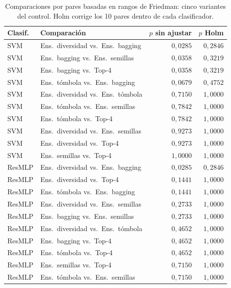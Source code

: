 \documentclass[11pt,a4paper]{article}
\begin{document}
\begin{table}[H]
\centering\fontsize{8}{10}\selectfont\setlength{\tabcolsep}{3.0pt}
\caption{Comparaciones por pares basadas en rangos de Friedman: cinco variantes del control. Holm corrige los 10 pares dentro de cada clasificador.}
\label{tab:sel-control-holm}
\begin{tabular}{@{}llrr@{}}
\toprule
Clasif. & Comparación & $p$ sin ajustar & $p$ Holm \\
\midrule
SVM & Ens.\ diversidad vs.\ Ens.\ bagging & $0{,}0285$ & $0{,}2846$ \\
SVM & Ens.\ bagging vs.\ Ens.\ semillas & $0{,}0358$ & $0{,}3219$ \\
SVM & Ens.\ bagging vs.\ Top-4 & $0{,}0358$ & $0{,}3219$ \\
SVM & Ens.\ tómbola vs.\ Ens.\ bagging & $0{,}0679$ & $0{,}4752$ \\
SVM & Ens.\ diversidad vs.\ Ens.\ tómbola & $0{,}7150$ & $1{,}0000$ \\
SVM & Ens.\ tómbola vs.\ Ens.\ semillas & $0{,}7842$ & $1{,}0000$ \\
SVM & Ens.\ tómbola vs.\ Top-4 & $0{,}7842$ & $1{,}0000$ \\
SVM & Ens.\ diversidad vs.\ Ens.\ semillas & $0{,}9273$ & $1{,}0000$ \\
SVM & Ens.\ diversidad vs.\ Top-4 & $0{,}9273$ & $1{,}0000$ \\
SVM & Ens.\ semillas vs.\ Top-4 & $1{,}0000$ & $1{,}0000$ \\
ResMLP & Ens.\ diversidad vs.\ Ens.\ bagging & $0{,}0285$ & $0{,}2846$ \\
ResMLP & Ens.\ diversidad vs.\ Top-4 & $0{,}1441$ & $1{,}0000$ \\
ResMLP & Ens.\ tómbola vs.\ Ens.\ bagging & $0{,}1441$ & $1{,}0000$ \\
ResMLP & Ens.\ diversidad vs.\ Ens.\ semillas & $0{,}2733$ & $1{,}0000$ \\
ResMLP & Ens.\ bagging vs.\ Ens.\ semillas & $0{,}2733$ & $1{,}0000$ \\
ResMLP & Ens.\ diversidad vs.\ Ens.\ tómbola & $0{,}4652$ & $1{,}0000$ \\
ResMLP & Ens.\ bagging vs.\ Top-4 & $0{,}4652$ & $1{,}0000$ \\
ResMLP & Ens.\ tómbola vs.\ Top-4 & $0{,}4652$ & $1{,}0000$ \\
ResMLP & Ens.\ semillas vs.\ Top-4 & $0{,}7150$ & $1{,}0000$ \\
ResMLP & Ens.\ tómbola vs.\ Ens.\ semillas & $0{,}7150$ & $1{,}0000$ \\
\bottomrule
\end{tabular}
\end{table}
\end{document}
